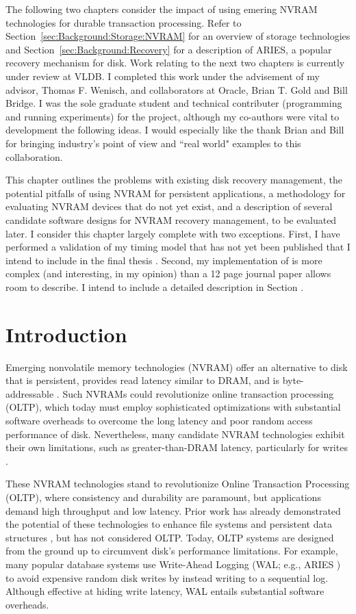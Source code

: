 The following two chapters consider the impact of using emering NVRAM technologies for durable transaction processing.
Refer to Section~\ref{sec:Background:Storage:NVRAM} for an overview of storage technologies and Section~\ref{sec:Background:Recovery} for a description of ARIES, a popular recovery mechanism for disk.
Work relating to the next two chapters is currently under review at VLDB.
I completed this work under the advisement of my advisor, Thomas F. Wenisch, and collaborators at Oracle, Brian T. Gold and Bill Bridge.
I was the sole graduate student and technical contributer (programming and running experiments) for the project, although my co-authors were vital to development the following ideas.
I would especially like the thank Brian and Bill for bringing industry's point of view and ``real world" examples to this collaboration.

This chapter outlines the problems with existing disk recovery management, the potential pitfalls of using NVRAM for persistent applications, a methodology for evaluating NVRAM devices that do not yet exist, and a description of several candidate software designs for NVRAM recovery management, to be evaluated later.
I consider this chapter largely complete with two exceptions.
First, I have performed a validation of my timing model that has not yet been published that I intend to include in the final thesis .
Second, my implementation of \GroupCommit is more complex (and interesting, in my opinion) than a 12 page journal paper allows room to describe.
I intend to include a detailed description in Section .

\section{Introduction}
\label{sec:OLTP_design:Intro}

Emerging nonvolatile memory technologies (NVRAM) offer an alternative to disk that is persistent, provides read latency similar to DRAM, and is byte-addressable \cite{BurrKurdi08}.
Such NVRAMs could revolutionize online transaction processing (OLTP), which today must employ sophisticated optimizations with substantial software overheads to overcome the long latency and poor random access performance of disk.
Nevertheless, many candidate NVRAM technologies exhibit their own limitations, such as greater-than-DRAM latency, particularly for writes \cite{LeeIpek09}.

These NVRAM technologies stand to revolutionize Online Transaction Processing (OLTP), where consistency and durability are paramount, but applications demand high throughput and low latency.
Prior work has already demonstrated the potential of these technologies to enhance file systems \cite{GreenanMiller06, ConditNightingale09} and persistent data structures \cite{VenkataramanTolia11}, but has not considered OLTP. 
Today, OLTP systems are designed from the ground up to circumvent disk's performance limitations.
For example, many popular database systems use Write-Ahead Logging (WAL; e.g., ARIES \cite{MohanHaderle92}) to avoid expensive random disk writes by instead writing to a sequential log.  
Although effective at hiding write latency, WAL entails substantial software overheads.

